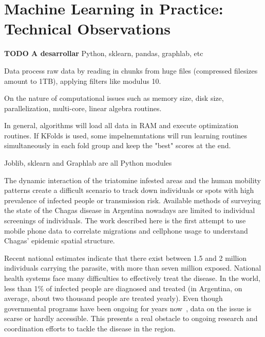 \section{Machine Learning in Practice: Technical Observations}
\textbf{TODO A desarrollar}
Python, sklearn, pandas, graphlab, etc

Data process raw data by reading in chunks from huge files (compressed filesizes amount to 1TB), applying filters like modulus 10.

On the nature of computational issues such as memory size, disk size, parallelization, multi-core, linear algebra routines.

In general, algorithms will load all data in RAM and execute optimization routines. If KFolds is used, some impelnemntations will run learning routines simultaneously in each fold group and keep the "best" scores at the end.

Joblib, sklearn and Graphlab are all Python modules



The dynamic interaction of the triatomine infested areas and the human mobility patterns create a difficult scenario to track down individuals or spots with high prevalence of infected people or transmission risk. Available methods of surveying the state of the Chagas disease in Argentina nowadays are limited to individual screenings of individuals. The work described here is the first attempt to use mobile phone data to correlate migrations and cellphone usage to understand Chagas’ epidemic spatial structure.

Recent national estimates indicate that there exist between 1.5 and 2 million individuals carrying the parasite, with more than seven million exposed. 
National health systems face many difficulties to effectively treat the disease. In the world, less than 1\% of infected people are diagnosed and treated (in Argentina, on average, about two thousand people are treated yearly). 
Even though governmental programs have been ongoing for years now~\cite{plan_nacional_chagas}, data on the issue is scarse or hardly accessible. This presents a real obstacle to ongoing research and coordination efforts to tackle the disease in the region.

